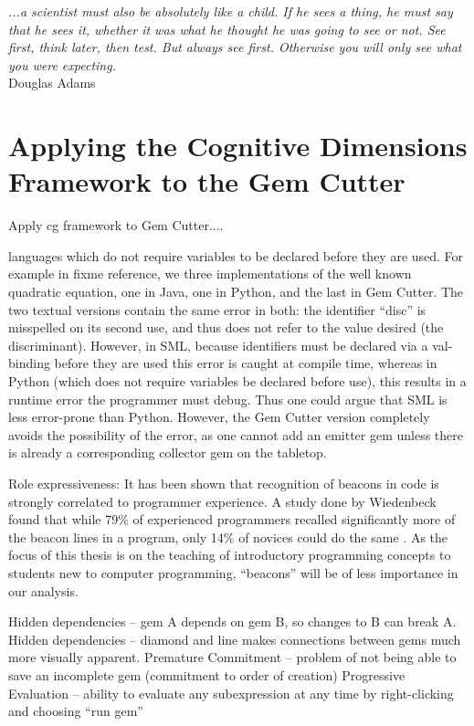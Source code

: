 \label{chapter:Exp}

\begin{flushright}
\textit{...a scientist must also be absolutely like a child.  If he sees a thing, he must say that he sees it, whether it was what he thought he was going to see or not.  See first, think later, then test.  But always see first.  Otherwise you will only see what you were expecting.}
\\
Douglas Adams \cite{Adams84} \\
\end{flushright}

\section{Applying the Cognitive Dimensions Framework to the Gem Cutter}

Apply cg framework to Gem Cutter....

languages which do not require variables to be declared before they are used.  For example in fixme reference, we three implementations of the well known quadratic equation, one in Java, one in Python, and the last in Gem Cutter.  The two textual versions contain the same error in both: the identifier ``disc'' is misspelled on its second use, and thus does not refer to the value desired (the discriminant).  However, in SML, because identifiers must be declared via a val-binding before they are used this error is caught at compile time, whereas in Python (which does not require variables be declared before use), this results in a runtime error the programmer must debug.  Thus one could argue that SML is less error-prone than Python.  However, the Gem Cutter version completely avoids the possibility of the error, as one cannot add an emitter gem unless there is already a corresponding collector gem on the tabletop.


Role expressiveness:
It has been shown that recognition of beacons in code is strongly correlated to programmer experience.  A study done by Wiedenbeck found that while 79\% of experienced programmers recalled significantly more of the beacon lines in a program, only 14\% of novices could do the same \cite{Wiedenbeck91}.  As the focus of this thesis is on the teaching of introductory programming concepts to students new to computer programming, ``beacons'' will be of less importance in our analysis.


Hidden dependencies -- gem A depends on gem B, so changes to B can break A.
Hidden dependencies -- diamond and line makes connections between gems much more visually apparent.
Premature Commitment -- problem of not being able to save an incomplete gem (commitment to order of creation)
Progressive Evaluation -- ability to evaluate any subexpression at any time by right-clicking and choosing ``run gem''

